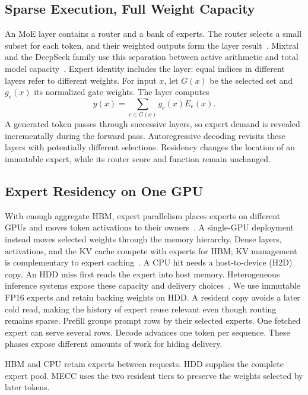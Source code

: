 \documentclass[conference,9pt,letterpaper]{IEEEtran}
\begin{document}
\subsection{Sparse Execution, Full Weight Capacity}
An MoE layer contains a router and a bank of experts. The router selects a small subset for each token, and their weighted outputs form the layer result~\cite{shazeer,switch,gshard}. Mixtral and the DeepSeek family use this separation between active arithmetic and total model capacity~\cite{mixtral,deepseekmoe,deepseekv2,deepseekv3,mixtral22}. Expert identity includes the layer: equal indices in different layers refer to different weights. For input $x$, let $G(x)$ be the selected set and $g_e(x)$ its normalized gate weights. The layer computes
\begin{equation}
y(x)=\sum_{e\in G(x)}g_e(x)E_e(x).
\end{equation}
A generated token passes through successive layers, so expert demand is revealed incrementally during the forward pass. Autoregressive decoding revisits these layers with potentially different selections. Residency changes the location of an immutable expert, while its router score and function remain unchanged.

\subsection{Expert Residency on One GPU}
With enough aggregate HBM, expert parallelism places experts on different GPUs and moves token activations to their owners~\cite{deepspeedmoe,tutel,megablocks,flashmoedist,harmoeny}. A single-GPU deployment instead moves selected weights through the memory hierarchy. Dense layers, activations, and the KV cache compete with experts for HBM; KV management is complementary to expert caching~\cite{pagedattention,sglang}. A CPU hit needs a host-to-device (H2D) copy. An HDD miss first reads the expert into host memory. Heterogeneous inference systems expose these capacity and delivery choices~\cite{flexgen,dsinference,zeroinfinity,llmflash,powerinfer}. We use immutable FP16 experts and retain backing weights on HDD. A resident copy avoids a later cold read, making the history of expert reuse relevant even though routing remains sparse. Prefill groups prompt rows by their selected experts. One fetched expert can serve several rows. Decode advances one token per sequence. These phases expose different amounts of work for hiding delivery.

HBM and CPU retain experts between requests. HDD supplies the complete expert pool. MECC uses the two resident tiers to preserve the weights selected by later tokens.
\end{document}
